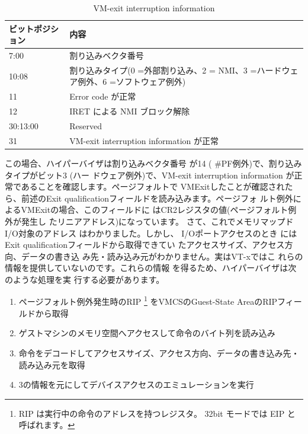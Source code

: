 \begin{table}
\begin{tabular}{|l|l|} \hline

ビットポジション & 内容 \\
\hline
7:00 & 割り込みベクタ番号 \\
\hline
10:08 & 割り込みタイプ(0 =外部割り込み、2 = NMI、3 =ハードウェア例外、6 =ソフトウェア例外) \\
\hline
11 & Error code が正常 \\
\hline
12 & IRET による NMI ブロック解除 \\
\hline
30:13:00 & Reserved \\
\hline
31 & VM-exit interruption information が正常 \\
\hline



\end{tabular}
\caption{VM-exit interruption information}
\label{tab2}
\end{table}

 この場合、ハイパーバイザは割り込みベクタ番号
が14 ( \#PF例外)で、割り込みタイプがビット3 (ハー
ドウェア例外)で、VM-exit interruption information
が正常であることを確認します。ページフォルトで
VMExitしたことが確認されたら、前述のExit
qualificationフィールドを読み込みます。ページフォ
ルト例外によるVMExitの場合、このフィールドに
はCR2レジスタの値(ページフォルト例外が発生し
たリニアアドレス)になっています。
 さて、これでメモリマップドI/O対象のアドレス
はわかりました。しかし、 I/Oポートアクセスのとき
にはExit qualificationフィールドから取得できてい
たアクセスサイズ、アクセス方向、データの書き込
み先・読み込み元がわかりません。実はVT-xではこ
れらの情報を提供していないのです。これらの情報
を得るため、ハイパーバイザは次のような処理を実
行する必要があります。

\begin{enumerate}

\item ページフォルト例外発生時のRIP
  \footnote[2]{
  RIP は実行中の命令のアドレスを持つレジスタ。 32bit モードでは EIP と呼ばれます。
  }
をVMCSのGuest-State AreaのRIPフィールドから取得
\item ゲストマシンのメモリ空間へアクセスして命令のバイト列を読み込み
\item 命令をデコードしてアクセスサイズ、アクセス方向、データの書き込み先・読み込み元を取得
\item 3の情報を元にしてデバイスアクセスのエミュレーションを実行
\end{enumerate}

